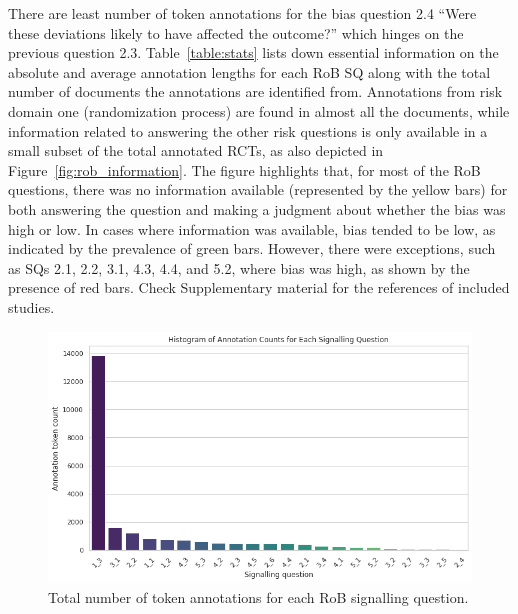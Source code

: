 \documentclass[sn-mathphys,Numbered]{sn-jnl}%
\theoremstyle{thmstyleone}%
\theoremstyle{thmstyletwo}%
\theoremstyle{thmstylethree}%
\begin{document}
 
There are least number of token annotations for the bias question 2.4 ``Were these deviations likely to have affected the outcome?'' which hinges on the previous question 2.3.
Table~\ref{table:stats} lists down essential information on the absolute and average annotation lengths for each RoB SQ along with the total number of documents the annotations are identified from.
Annotations from risk domain one (randomization process) are found in almost all the documents, while information related to answering the other risk questions is only available in a small subset of the total annotated RCTs, as also depicted in Figure~\ref{fig:rob_information}.
The figure highlights that, for most of the RoB questions, there was no information available (represented by the yellow bars) for both answering the question and making a judgment about whether the bias was high or low.
In cases where information was available, bias tended to be low, as indicated by the prevalence of green bars. 
However, there were exceptions, such as SQs 2.1, 2.2, 3.1, 4.3, 4.4, and 5.2, where bias was high, as shown by the presence of red bars.
Check Supplementary material for the references of included studies. %
%
%
%
\begin{figure}[htb]
    \centering
    \includegraphics[width=0.90\columnwidth]{figures/sq_ann_raw_counts.png}
    \caption{Total number of token annotations for each RoB signalling question.}
    \label{fig:ann_counts}
\end{figure}
%
%
%
\end{document}
